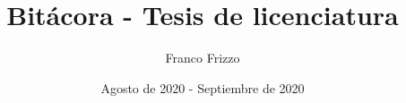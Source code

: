 \documentclass[11pt]{article}
\newcommand\myauthor{Franco Frizzo}
\newcommand\mytitle{Bitácora - Tesis de licenciatura}
\newcommand\mydate{Agosto de 2020 - Septiembre de 2020}
\begin{document}
\title{\mytitle}
\author{\myauthor}
\date{\mydate}




{}

\end{document}
